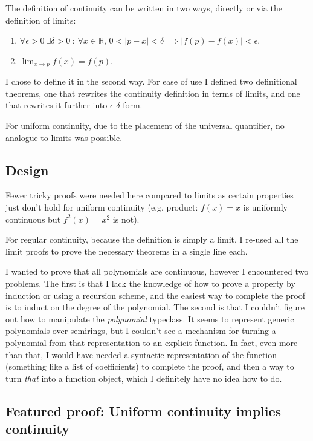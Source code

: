 \documentclass[a4paper, twoside, 11pt]{article}
\theoremstyle{definition}
\theoremstyle{plain}
\theoremstyle{remark}
\begin{document}
The definition of continuity can be written in two ways, directly or via the definition of limits:

\begin{enumerate}
    \item $\forall \epsilon > 0\ \exists \delta > 0\ :\ \forall x \in \mathbb{R},\, 0 < |p - x| < \delta \implies |f(p) - f(x)| < \epsilon$.
    \item $\lim_{x \to p} f(x) = f(p)$.
\end{enumerate}

I chose to define it in the second way. For ease of use I defined two definitional theorems, one that rewrites the continuity definition in terms of limits, and one that rewrites it further into $\epsilon$-$\delta$ form.

For uniform continuity, due to the placement of the universal quantifier, no analogue to limits was possible.

\subsection*{Design}

Fewer tricky proofs were needed here compared to limits as certain properties just don't hold for uniform continuity (e.g. product: $f(x) = x$ is uniformly continuous but $f^{2}(x) = x^{2}$ is not).

For regular continuity, because the definition is simply a limit, I re-used all the limit proofs to prove the necessary theorems in a single line each.

I wanted to prove that all polynomials are continuous, however I encountered two problems. The first is that I lack the knowledge of how to prove a property by induction or using a recursion scheme, and the easiest way to complete the proof is to induct on the degree of the polynomial. The second is that I couldn't figure out how to manipulate the \emph{polynomial} typeclass. It seems to represent generic polynomials over semirings, but I couldn't see a mechanism for turning a polynomial from that representation to an explicit function. In fact, even more than that, I would have needed a syntactic representation of the function (something like a list of coefficients) to complete the proof, and then a way to turn \emph{that} into a function object, which I definitely have no idea how to do.

\subsection*{Featured proof: Uniform continuity implies continuity}
\end{document}
